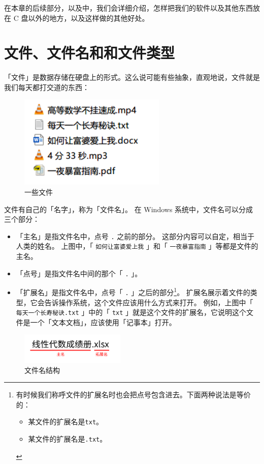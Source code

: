 在本章的后续部分，以及中，我们会详细介绍，怎样把我们的软件以及其他东西放在 C 盘以外的地方，以及这样做的其他好处。

\section{文件、文件名和和文件类型}

「文件」是数据存储在硬盘上的形式。这么说可能有些抽象，直观地说，文件就是我们每天都打交道的东西：

\begin{figure}[htb!]
  \centering
  \includegraphics[width=7cm]{assets/Files.png}
  \caption{一些文件}
  \label{Files}
\end{figure}

文件有自己的「名字」，称为「文件名」。
在 Windows 系统中，文件名可以分成三个部分：

\begin{itemize}
  \item 「主名」是指文件名中，点号 \verb|.| 之前的部分。
    这部分内容可以自定，相当于人类的姓名。
    上图中，「 \verb|如何让富婆爱上我| 」和「 \verb|一夜暴富指南| 」等都是文件的主名。
  \item 「点号」是指文件名中间的那个「 \verb|.| 」。
  \item 「扩展名」是指文件名中，点号「 \verb|.| 」之后的部分\footnote{有时候我们称呼文件的扩展名时也会把点号包含进去。下面两种说法是等价的：
      \begin{itemize}
        \item 某文件的扩展名是\texttt{txt}。
        \item 某文件的扩展名是\texttt{.txt}。
      \end{itemize}}。
    扩展名展示着文件的类型，它会告诉操作系统，这个文件应该用什么方式来打开。
    例如，上图中「 \verb|每天一个长寿秘诀.txt| 」中的「 \verb|txt| 」就是这个文件的扩展名，它说明这个文件是一个「文本文档」，应该使用「记事本」打开。
\end{itemize}

\begin{figure}[htb!]
  \centering
  \includegraphics[width=5cm]{assets/File_Name.png}
  \caption{文件名结构}
  \label{File_Name}
\end{figure}

